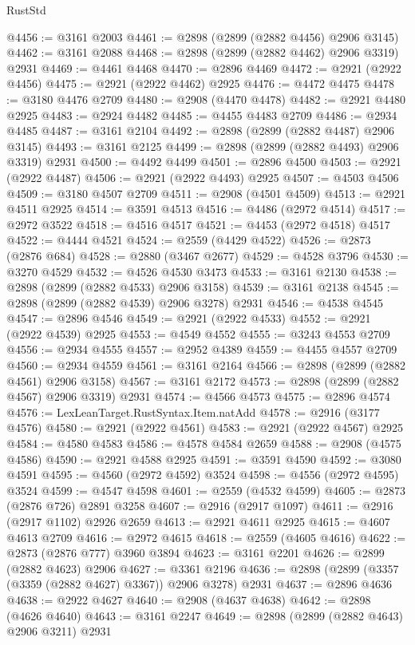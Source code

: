 \begin{lexlean}{RustStd}
\begin{coremodule}
@4456 := @3161 @2003
@4461 := @2898 (@2899 (@2882 @4456) @2906 @3145)
@4462 := @3161 @2088
@4468 := @2898 (@2899 (@2882 @4462) @2906 @3319) @2931
@4469 := @4461 @4468
@4470 := @2896 @4469
@4472 := @2921 (@2922 @4456)
@4475 := @2921 (@2922 @4462) @2925
@4476 := @4472 @4475
@4478 := @3180 @4476 @2709
@4480 := @2908 (@4470 @4478)
@4482 := @2921 @4480 @2925
@4483 := @2924 @4482
@4485 := @4455 @4483 @2709
@4486 := @2934 @4485
@4487 := @3161 @2104
@4492 := @2898 (@2899 (@2882 @4487) @2906 @3145)
@4493 := @3161 @2125
@4499 := @2898 (@2899 (@2882 @4493) @2906 @3319) @2931
@4500 := @4492 @4499
@4501 := @2896 @4500
@4503 := @2921 (@2922 @4487)
@4506 := @2921 (@2922 @4493) @2925
@4507 := @4503 @4506
@4509 := @3180 @4507 @2709
@4511 := @2908 (@4501 @4509)
@4513 := @2921 @4511 @2925
@4514 := @3591 @4513
@4516 := @4486 (@2972 @4514)
@4517 := @2972 @3522
@4518 := @4516 @4517
@4521 := @4453 (@2972 @4518) @4517
@4522 := @4444 @4521
@4524 := @2559 (@4429 @4522)
@4526 := @2873 (@2876 @684)
@4528 := @2880 (@3467 @2677)
@4529 := @4528 @3796
@4530 := @3270 @4529
@4532 := @4526 @4530 @3473
@4533 := @3161 @2130
@4538 := @2898 (@2899 (@2882 @4533) @2906 @3158)
@4539 := @3161 @2138
@4545 := @2898 (@2899 (@2882 @4539) @2906 @3278) @2931
@4546 := @4538 @4545
@4547 := @2896 @4546
@4549 := @2921 (@2922 @4533)
@4552 := @2921 (@2922 @4539) @2925
@4553 := @4549 @4552
@4555 := @3243 @4553 @2709
@4556 := @2934 @4555
@4557 := @2952 @4389
@4559 := @4455 @4557 @2709
@4560 := @2934 @4559
@4561 := @3161 @2164
@4566 := @2898 (@2899 (@2882 @4561) @2906 @3158)
@4567 := @3161 @2172
@4573 := @2898 (@2899 (@2882 @4567) @2906 @3319) @2931
@4574 := @4566 @4573
@4575 := @2896 @4574
@4576 := LexLeanTarget.RustSyntax.Item.natAdd
@4578 := @2916 (@3177 @4576)
@4580 := @2921 (@2922 @4561)
@4583 := @2921 (@2922 @4567) @2925
@4584 := @4580 @4583
@4586 := @4578 @4584 @2659
@4588 := @2908 (@4575 @4586)
@4590 := @2921 @4588 @2925
@4591 := @3591 @4590
@4592 := @3080 @4591
@4595 := @4560 (@2972 @4592) @3524
@4598 := @4556 (@2972 @4595) @3524
@4599 := @4547 @4598
@4601 := @2559 (@4532 @4599)
@4605 := @2873 (@2876 @726) @2891 @3258
@4607 := @2916 (@2917 @1097)
@4611 := @2916 (@2917 @1102) @2926 @2659
@4613 := @2921 @4611 @2925
@4615 := @4607 @4613 @2709
@4616 := @2972 @4615
@4618 := @2559 (@4605 @4616)
@4622 := @2873 (@2876 @777) @3960 @3894
@4623 := @3161 @2201
@4626 := @2899 (@2882 @4623) @2906
@4627 := @3361 @2196
@4636 := @2898 (@2899 (@3357 (@3359 (@2882 @4627) @3367)) @2906 @3278) @2931
@4637 := @2896 @4636
@4638 := @2922 @4627
@4640 := @2908 (@4637 @4638)
@4642 := @2898 (@4626 @4640)
@4643 := @3161 @2247
@4649 := @2898 (@2899 (@2882 @4643) @2906 @3211) @2931

\end{coremodule}
\end{lexlean}
